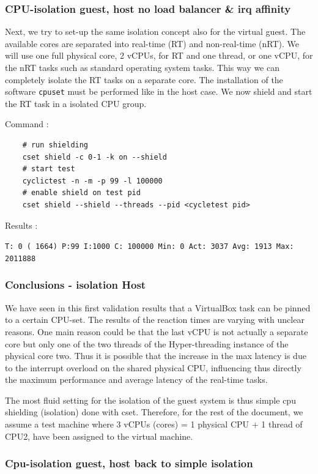 \documentclass[]{scrartcl}
\begin{document}
\subsubsection{CPU-isolation guest, host no load balancer \& irq affinity}

Next, we try to set-up the same isolation concept also for the virtual guest. The available cores are separated into real-time (RT) and non-real-time (nRT). We will use one full physical core, 2 vCPUs, for RT and one thread, or one vCPU, for the nRT tasks such as standard operating system tasks. This way we can completely isolate the RT tasks on a separate core. The installation of the software \texttt{cpuset} must be performed like in the host case. We now shield and start the RT task in a isolated CPU group.

\noindent Command : 

\begin{verbatim}
	# run shielding
	cset shield -c 0-1 -k on --shield
	# start test
	cyclictest -n -m -p 99 -l 100000
	# enable shield on test pid
	cset shield --shield --threads --pid <cycletest pid>
\end{verbatim}

\noindent Results :

\noindent \texttt{T: 0 ( 1664) P:99 I:1000 C: 100000 Min:      0 Act: 3037 Avg: 1913 Max:  2011888}

\subsubsection{Conclusions - isolation Host}

We have seen in this first validation results that a VirtualBox task can be pinned to a certain CPU-set. The results of the reaction times are varying with unclear reasons. One main reason could be that the last vCPU is not actually a separate core but only one of the two threads of the Hyper-threading instance of the physical core two. Thus it is possible that the increase in the max latency is due to the interrupt overload on the shared physical CPU, influencing thus directly the maximum performance and average latency of the real-time tasks.

The most fluid setting for the isolation of the guest system is thus simple cpu shielding (isolation) done with cset. Therefore, for the rest of the document, we assume a test machine where 3 vCPUs (cores) = 1 physical CPU + 1 thread of CPU2, have been assigned to the virtual machine.

\subsubsection{Cpu-isolation guest, host back to simple isolation}
\end{document}
